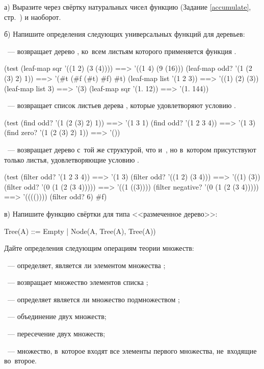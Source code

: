 \newpage
\begin{Assignment}
а) Выразите через свёртку натуральных чисел  функцию  (Задание \ref{accumulate}, стр.~\pageref{accumulate}) и наоборот.

б) Напишите определения следующих универсальных функций для деревьев:

 ~--- возвращает дерево , ко~всем листьям которого применяется функция .
\begin{Specification}
(test 
  (leaf-map sqr '((1 2) (3 (4))))  ==> '((1 4) (9 (16)))
  (leaf-map odd? '(1 (2 (3) 2) 1)) ==> '(#t (#f (#t) #f) #t)
  (leaf-map list '(1 2 3))         ==> '((1) (2) (3))
  (leaf-map list 3)                ==> '(3)
  (leaf-map sqr '(1. 12))          ==> '(1. 144))
\end{Specification}

 ~--- возвращает список листьев дерева , которые удовлетворяют условию .
\begin{Specification}
(test 
  (find odd? '(1 (2 (3) 2) 1))   ==> '(1 3 1)
  (find odd? '(1 2 3 4))         ==> '(1 3)
  (find zero? '(1 (2 (3) 2) 1))  ==> '())
\end{Specification}

~--- возвращает дерево с~той же структурой, что и~, но в~котором присутствуют только листья, удовлетворяющие условию .
\begin{Specification}
(test 
  (filter odd? '(1 2 3 4))              ==> '(1 3)
  (filter odd? '((1 2) (3 4)))          ==> '((1) (3))
  (filter odd? '(0 (1 (2 (3 4)))))      ==> '((1 ((3))))
  (filter negative? '(0 (1 (2 (3 4))))) ==> '(((())))
  (filter odd? 6)  #f)
\end{Specification}

в) Напишите функцию свёртки для типа <<размеченное дерево>>:
\begin{SchemeCode}
    Tree(A) ::= Empty
             |  Node(A, Tree(A), Tree(A))
\end{SchemeCode}
\end{Assignment}


\newpage
\begin{Assignment}
\label{as:set}Дайте определения следующим операциям теории множеств:

~--- определяет, является ли  элементом множества ;

~--- возвращает множество элементов списка ;

~--- определяет является ли множество  подмножеством ;

~--- объединение двух множеств;

\label{intersection}~--- пересечение двух множеств;

\label{complement}~---  множество, в~которое входят все элементы первого множества, не~входящие во~второе.
\end{Assignment}

